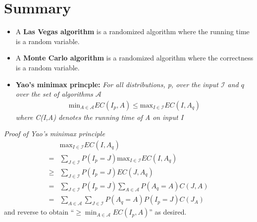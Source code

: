 \section*{Summary}
\begin{itemize}
	\item A \textbf{Las Vegas algorithm} is a randomized algorithm where the running time is a random variable.
	\item A \textbf{Monte Carlo algorithm} is a randomized algorithm where the correctness is a random variable.
	\item \textbf{Yao's minimax princple:} \textit{For all distributions, p, over the input
			$\mathcal{I}$ and $q$ over the set of algorithms $\mathcal{A}$}
			\begin{align*}
				\text{min}_{A \in \mathcal{A}}EC(I_p,A) \leq \text{max}_{I \in \mathcal{I}}EC(I,A_q)
			\end{align*}
			\textit{where C(I,A) denotes the running time of A on input I}
\end{itemize}
\textit{Proof of Yao's minimax principle}
\begin{align*}
	&\text{max}_{I \in \mathcal{I}}EC(I, A_q) \\
	=& \sum_{J \in \mathcal{I}}P(I_p=J) \text{max}_{I \in \mathcal{I}}EC(I,A_q) \\
	\geq& \sum_{J \in \mathcal{I}}P(I_p=J)EC(J,A_q) \\
	=& \sum_{J \in \mathcal{I}}P(I_p=J) \sum_{A \in \mathcal{A}}P(A_q=A)C(J,A) \\
	=& \sum_{A \in \mathcal{A}} \sum_{J \in \mathcal{I}}P(A_q=A)P(I_p=J)C(J_A)
\end{align*}
and reverse to obtain ``$\geq \min_{A \in \mathcal{A}}EC(I_p,A)$'' as desired.
\newpage
